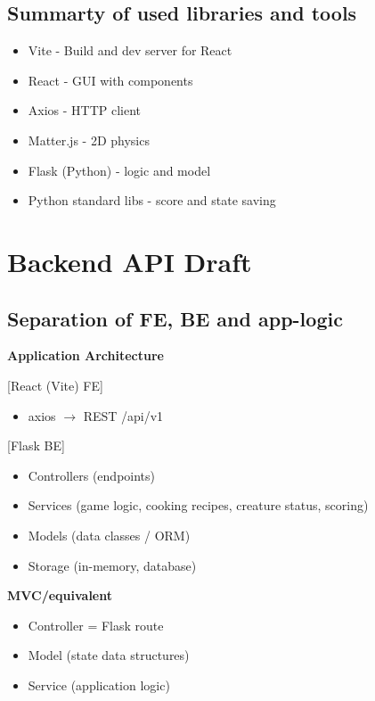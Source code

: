 \documentclass[11pt]{article}
\begin{document}
\subsection{Summarty of used libraries and tools}
\begin{itemize}
    \item Vite - Build and dev server for React
    \item React - GUI with components
    \item Axios - HTTP client
    \item Matter.js - 2D physics
    \item Flask (Python) - logic and model
    \item Python standard libs - score and state saving
\end{itemize}

\section{Backend API Draft}
\subsection{Separation of FE, BE and app-logic}
\textbf{Application Architecture}

[React (Vite) FE]
\begin{itemize}
    \item axios $\rightarrow$ REST /api/v1
\end{itemize}

[Flask BE]
\begin{itemize}
    \item Controllers (endpoints)
    \item Services (game logic, cooking recipes, creature status, scoring)
    \item Models (data classes / ORM)
    \item Storage (in-memory, database)
\end{itemize}


\noindent\textbf{MVC/equivalent}
\begin{itemize}
    \item Controller = Flask route
    \item Model (state data structures)
    \item Service (application logic)
\end{itemize}
\end{document}

